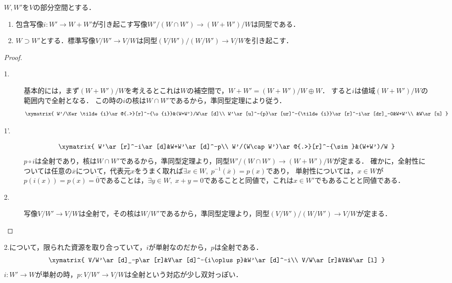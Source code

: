 \documentclass[uplatex, dvipdfmx]{jsreport}
\begin{document}
\begin{corollary}
    $W,W'$を$V$の部分空間とする．
    \begin{enumerate}
        \item 包含写像$i:W'\to W+W'$が引き起こす写像$W'/(W\cap W')\to(W+W')/W$は同型である．
        \item $W\supset W'$とする．標準写像$V/W'\to V/W$は同型$(V/W')/(W/W')\to V/W$を引き起こす．
    \end{enumerate}
\end{corollary}
\begin{proof}\mbox{}
    \begin{description}
        \item[1.] 基本的には，まず$(W+W')/W$を考えるとこれは$W$の補空間で，$W+W'=(W+W')/W\oplus W$．
        すると$i$は値域$(W+W')/W$の範囲内で全射となる．
        この時の$i$の核は$W\cap W'$であるから，準同型定理により従う．
        \[\xymatrix{
            W'/\Ker\tilde{i}\ar@{.>}[r]^-{\o{i}}&(W+W')/W\ar[d]\\
            W'\ar[u]^-{p}\ar[ur]^-{\tilde{i}}\ar[r]^-i\ar[dr]_-0&W+W'\\
            &W\ar[u]
        }\]
        \item[1'.] 
        \[\xymatrix{
            W'\ar[r]^-i\ar[d]&W+W'\ar[d]^-p\\
            W'/(W\cap W')\ar@{.>}[r]^-{\sim}&(W+W')/W
        }\]
        $p\circ i$は全射であり，核は$W\cap W'$であるから，準同型定理より，同型$W'/(W\cap W')\to(W+W')/W$が定まる．
        確かに，全射性については任意の$\overline{x}$について，代表元$x$をうまく取れば$\exists x\in W,\;p^{-1}(\overline{x})=p(x)$であり，
        単射性については，$x\in W$が$p(i(x))=p(x)=\overline{0}$であることは，$\exists y\in W,\;x+y=0$であることと同値で，これは$x\in W'$でもあることと同値である．
        \item[2.] 写像$V/W'\to V/W$は全射で，その核は$W/W'$であるから，準同型定理より，同型$(V/W')/(W/W')\to V/W$が定まる．
    \end{description}
\end{proof}
\begin{remarks}
    2.について，限られた資源を取り合っていて，$i$が単射なのだから，$p$は全射である．
    \[\xymatrix{
        V/W'\ar[d]_-p\ar[r]&V\ar[d]^-{i\oplus p}&W'\ar[d]^-i\\
        V/W\ar[r]&V&W\ar[l]
    }\]
    $i:W'\to W$が単射の時，$p:V/W'\to V/W$は全射という対応が少し双対っぽい．
\end{remarks}
\end{document}
